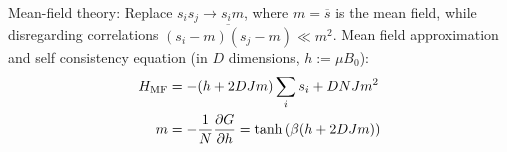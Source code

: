 			\noindent
			Mean-field theory: \newline
			Replace $s_i s_j \rightarrow s_i m$, where $m = \overline{s}$ is the mean field, while disregarding correlations $\overline{(s_i-m)(s_j-m)}\ll m^2$. \nl
			Mean field approximation and self consistency equation (in $D$ dimensions, $h:=\mu B_0$):
			\begin{equation}
				\begin{aligned}
					H_\text{MF} &= -(h + 2 D J m) \sum_i s_i + D N J m^2 \\
					m &= -\frac{1}{N}\pdv{G}{h} = \tanh\left({\beta(h + 2 D J m)}\right)
				\end{aligned}
			\end{equation}
